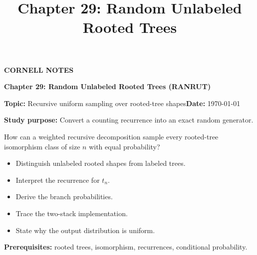 \documentclass[10pt,letterpaper]{article}
\title{Chapter 29: Random Unlabeled Rooted Trees}
\author{}
\date{}
\begin{document}
\maketitle
\begin{tcolorbox}[colback=Paper,colframe=Ink]{\small\bfseries\color{Teal}CORNELL NOTES}\par{\LARGE\bfseries Chapter 29: Random Unlabeled Rooted Trees (RANRUT)}\par\medskip\textbf{Topic:} Recursive uniform sampling over rooted-tree shapes\hfill\textbf{Date:} \today\par\textbf{Study purpose:} Convert a counting recurrence into an exact random generator.\end{tcolorbox}
\begin{tcolorbox}[colback=Teal!5,colframe=Teal,title=Essential question]How can a weighted recursive decomposition sample every rooted-tree isomorphism class of size $n$ with equal probability?\end{tcolorbox}
\begin{tcolorbox}[colback=white,colframe=Mist,title=Learning objectives]\begin{itemize}\item Distinguish unlabeled rooted shapes from labeled trees.\item Interpret the recurrence for $t_n$.\item Derive the branch probabilities.\item Trace the two-stack implementation.\item State why the output distribution is uniform.\end{itemize}\textbf{Prerequisites:} rooted trees, isomorphism, recurrences, conditional probability.\end{tcolorbox}
\end{document}
